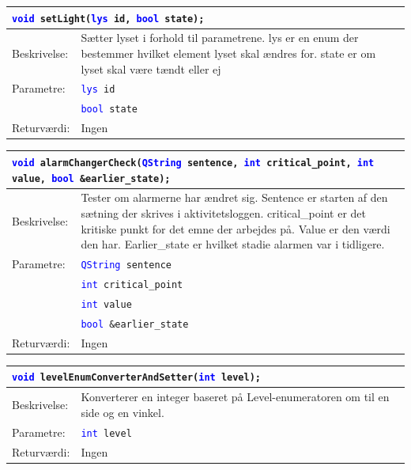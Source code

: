 \begin{table}[H]
\begin{tabular}{l p{12.5cm}}
\multicolumn{2}{l}{\texttt{\textcolor{blue}{void} setLight(\textcolor{blue}{lys} id, \textcolor{blue}{bool} state);}} \\
\hline
Beskrivelse:&Sætter lyset i forhold til parametrene. lys er en enum der bestemmer hvilket element lyset skal ændres for. state er om lyset skal være tændt eller ej\\
Parametre:&\texttt{\textcolor{blue}{lys} id}\\
&\texttt{\textcolor{blue}{bool} state}\\
Returværdi:&Ingen\\
\end{tabular}
\end{table}


\begin{table}[H]
\begin{tabular}{l p{12.5cm}}
\multicolumn{2}{l}{\texttt{\textcolor{blue}{void} alarmChangerCheck(\textcolor{blue}{QString} sentence, \textcolor{blue}{int} critical\_point, \textcolor{blue}{int} value, \textcolor{blue}{bool} \&earlier\_state);}} \\
\hline
Beskrivelse: &Tester om alarmerne har ændret sig. Sentence er starten af den sætning der skrives i aktivitetsloggen. critical\_point er det kritiske punkt for det emne der arbejdes på. Value er den værdi den har. Earlier\_state er hvilket stadie alarmen var i tidligere.\\
Parametre:&\texttt{\textcolor{blue}{QString} sentence}\\
&\texttt{\textcolor{blue}{int} critical\_point}\\
&\texttt{\textcolor{blue}{int} value}\\
&\texttt{\textcolor{blue}{bool} \&earlier\_state}\\
Returværdi:&Ingen\\
\end{tabular}
\end{table}

\begin{table}[H]
\begin{tabular}{l p{12.5cm}}
\multicolumn{2}{l}{\texttt{\textcolor{blue}{void} levelEnumConverterAndSetter(\textcolor{blue}{int} level);}} \\
\hline
Beskrivelse: &Konverterer en integer baseret på Level-enumeratoren om til en side og en vinkel.\\
Parametre:&\texttt{\textcolor{blue}{int} level}\\
Returværdi:&Ingen\\
\end{tabular}
\end{table}


